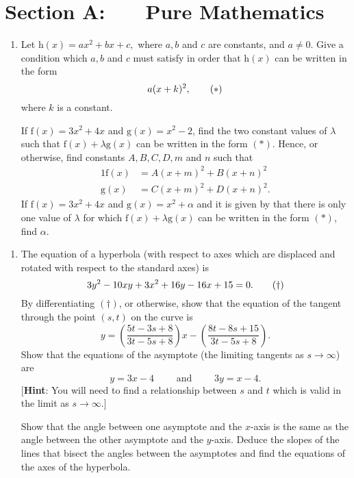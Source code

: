 \documentclass[a4, 11pt]{report}
\newlength{\qspace}
\newcounter{qnumber}
\newenvironment{question}%
 {\vspace{\qspace}
  \begin{enumerate}[\bfseries 1\quad][10]%
    \setcounter{enumi}{\value{qnumber}}%
    \item%
 }
{
  \end{enumerate}
  \filbreak
  \stepcounter{qnumber}
 }
\begin{document}
\setcounter{page}{2}

 
\section*{Section A: \ \ \ Pure Mathematics}

\begin{question}
Let $\mathrm{h}(x)=ax^{2}+bx+c,$ where $a,b$ and $c$ are constants,
and $a\neq0$. Give a condition which $a,b$ and $c$ must satisfy
in order that $\mathrm{h}(x)$ can be written in the form 
\[
a(x+k)^{2},\tag{\ensuremath{*}}
\]
where $k$ is a constant. 


If $\mathrm{f}(x)=3x^{2}+4x$ and $\mathrm{g}(x)=x^{2}-2$, find the
two constant values of $\lambda$ such that $\mathrm{f}(x)+\lambda\mathrm{g}(x)$
can be written in the form $(*)$. Hence, or otherwise, find constants
$A,B,C,D,m$ and $n$ such that 
\begin{alignat*}{1}
\mathrm{f}(x) & =A(x+m)^{2}+B(x+n)^{2}\\
\mathrm{g}(x) & =C(x+m)^{2}+D(x+n)^{2}.
\end{alignat*}
If $\mathrm{f}(x)=3x^{2}+4x$ and $\mathrm{g}(x)=x^{2}+\alpha$ and
it is given by that there is only one value of $\lambda$ for which
$\mathrm{f}(x)+\lambda\mathrm{g}(x)$ can be written in the form $(*)$,
find $\alpha$. 
\end{question}

\begin{question}
	The equation of a hyperbola (with respect to axes which are displaced
	and rotated with respect to the standard axes) is 
	\[
	3y^{2}-10xy+3x^{2}+16y-16x+15=0.\tag{\ensuremath{\dagger}}
	\]
	By differentiating $(\dagger)$, or otherwise, show that the equation
	of the tangent through the point $(s,t)$ on the curve is 
	\[
	y=\left(\frac{5t-3s+8}{3t-5s+8}\right)x-\left(\frac{8t-8s+15}{3t-5s+8}\right).
	\]
	Show that the equations of the asymptote (the limiting tangents as
	$s\rightarrow\infty$) are 
	\[
	y=3x-4\qquad\mbox{ and }\qquad3y=x-4.
	\]
	{[}\textbf{Hint}:\textbf{ }You will need to find a relationship between
	$s$ and $t$ which is valid in the limit as $s\rightarrow\infty.${]}


	Show that the angle between one asymptote and the $x$-axis is the
	same as the angle between the other asymptote and the $y$-axis. Deduce
	the slopes of the lines that bisect the angles between the asymptotes
	and find the equations of the axes of the hyperbola.
\end{question}
\end{document}
